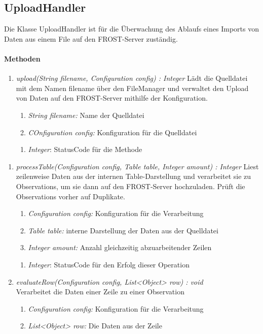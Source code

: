 \subsection*{UploadHandler}\label{uploadHandler}
Die Klasse UploadHandler ist für die Überwachung des Ablaufs eines Imports von Daten aus einem File auf den FROST-Server zuständig.

\paragraph{Methoden}
\begin{enumerate}[+]
\item \textit{upload(String filename, Configuration config) : Integer}
Lädt die Quelldatei mit dem Namen filename über den FileManager und verwaltet den Upload von Daten auf den FROST-Server mithilfe der Konfiguration.
\begin{enumerate}[$\bullet$]
\item \textit{String filename:} Name der Quelldatei
\item \textit{COnfiguration config:} Konfiguration für die Quelldatei 
\end{enumerate}
\vspace{-0.2cm}
\begin{enumerate}[$\circ$]
\item \textit{Integer}: StatusCode für die Methode
\end{enumerate}
\end{enumerate}

\begin{enumerate}[$-$]
\item \textit{processTable(Configuration config, Table table, Integer amount) : Integer} Liest zeilenweise Daten aus der internen Table-Darstellung und verarbeitet sie zu Observations, um sie dann auf den FROST-Server hochzuladen. Prüft die Observations vorher auf Duplikate.
\begin{enumerate}[$\bullet$]
\item \textit{Configuration config:} Konfiguration für die Verarbeitung
\item \textit{Table table:} interne Darstellung der Daten aus der Quelldatei
\item \textit{Integer amount:} Anzahl gleichzeitig abzuarbeitender Zeilen
\end{enumerate}
\vspace{-0.2cm}
\begin{enumerate}[$\circ$]
\item \textit{Integer}: StatusCode für den Erfolg dieser Operation
\end{enumerate}


\item \textit{evaluateRow(Configuration config, List<Object> row) : void}\\
Verarbeitet die Daten einer Zeile zu einer Observation
\begin{enumerate}[$\bullet$]
\item \textit{Configuration config:} Konfiguration für die Verarbeitung
\item \textit{List<Object> row:} Die Daten aus der Zeile
\end{enumerate}
\end{enumerate}